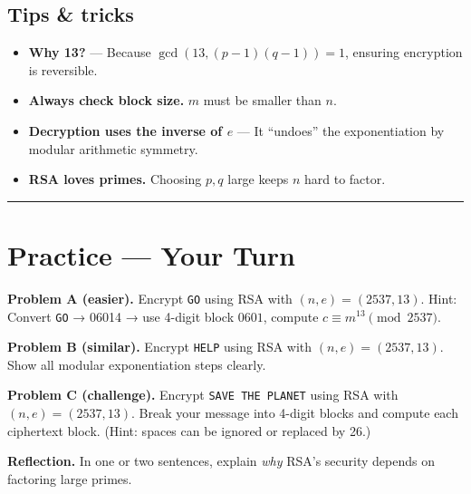 \documentclass[12pt]{article}
\newcommand{\workbox}[1]{\fbox{\parbox{\dimexpr\textwidth-2\fboxsep-2\fboxrule\relax}{\vspace{#1}}}}
\begin{document}
\subsection*{Tips \& tricks}
\begin{itemize}[leftmargin=1.25em]
  \item \textbf{Why 13?} — Because \(\gcd(13, (p-1)(q-1)) = 1\), ensuring encryption is reversible.
  \item \textbf{Always check block size.} \(m\) must be smaller than \(n\).
  \item \textbf{Decryption uses the inverse of \(e\)} — It “undoes” the exponentiation by modular arithmetic symmetry.
  \item \textbf{RSA loves primes.} Choosing \(p,q\) large keeps \(n\) hard to factor.
\end{itemize}

\bigskip
\hrule
\vspace{0.6em}

\section*{Practice — Your Turn}

\textbf{Problem A (easier).} Encrypt \texttt{GO} using RSA with \((n,e)=(2537,13)\).  
Hint: Convert \texttt{GO} → 06014 → use 4-digit block \(0601\), compute \(c \equiv m^{13} \pmod{2537}\).
\workbox{2.2cm}

\textbf{Problem B (similar).} Encrypt \texttt{HELP} using RSA with \((n,e)=(2537,13)\).  
Show all modular exponentiation steps clearly.
\workbox{3.0cm}

\textbf{Problem C (challenge).} Encrypt \texttt{SAVE THE PLANET} using RSA with \((n,e)=(2537,13)\).  
Break your message into 4-digit blocks and compute each ciphertext block.  
(Hint: spaces can be ignored or replaced by 26.)
\workbox{4.2cm}

\bigskip
\textbf{Reflection.} In one or two sentences, explain \emph{why} RSA’s security depends on factoring large primes.
\workbox{1.5cm}
\end{document}
